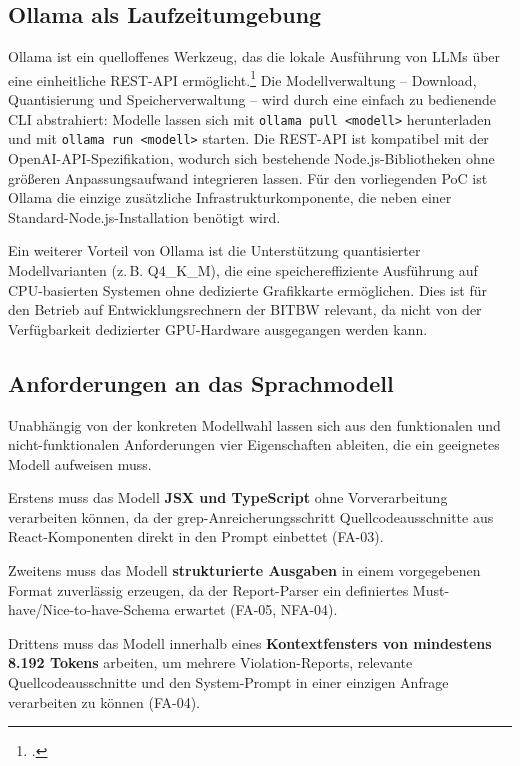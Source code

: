 \subsection{Ollama als Laufzeitumgebung}
 
Ollama ist ein quelloffenes Werkzeug, das die lokale Ausführung von \ac{LLM}s über eine einheitliche REST-\ac{API} ermöglicht.\footcite[Vgl.][]{Ollama} Die Modellverwaltung -- Download, Quantisierung und Speicherverwaltung -- wird durch eine einfach zu bedienende \ac{CLI} abstrahiert: Modelle lassen sich mit \texttt{ollama pull <modell>} herunterladen und mit \texttt{ollama run <modell>} starten. Die REST-\ac{API} ist kompatibel mit der OpenAI-\ac{API}-Spezifikation, wodurch sich bestehende Node.js-Bibliotheken ohne größeren Anpassungsaufwand integrieren lassen. Für den vorliegenden \ac{PoC} ist Ollama die einzige zusätzliche Infrastrukturkomponente, die neben einer Standard-Node.js-Installation benötigt wird.
 
Ein weiterer Vorteil von Ollama ist die Unterstützung quantisierter Modellvarianten (z.\,B. Q4\_K\_M), die eine speichereffiziente Ausführung auf \ac{CPU}-basierten Systemen ohne dedizierte Grafikkarte ermöglichen. Dies ist für den Betrieb auf Entwicklungsrechnern der \ac{BITBW} relevant, da nicht von der Verfügbarkeit dedizierter \ac{GPU}-Hardware ausgegangen werden kann.
 
\subsection{Anforderungen an das Sprachmodell}
 
Unabhängig von der konkreten Modellwahl lassen sich aus den funktionalen und nicht-funktionalen Anforderungen vier Eigenschaften ableiten, die ein geeignetes Modell aufweisen muss.
 
Erstens muss das Modell \textbf{JSX und TypeScript} ohne Vorverarbeitung verarbeiten können, da der grep-Anreicherungsschritt Quellcodeausschnitte aus React-Komponenten direkt in den Prompt einbettet (\ac{FA}-03).
 
Zweitens muss das Modell \textbf{strukturierte Ausgaben} in einem vorgegebenen Format zuverlässig erzeugen, da der Report-Parser ein definiertes Must-have/Nice-to-have-Schema erwartet (\ac{FA}-05, \ac{NFA}-04).
 
Drittens muss das Modell innerhalb eines \textbf{Kontextfensters von mindestens 8.192 Tokens} arbeiten, um mehrere Violation-Reports, relevante Quellcodeausschnitte und den System-Prompt in einer einzigen Anfrage verarbeiten zu können (\ac{FA}-04).
 
